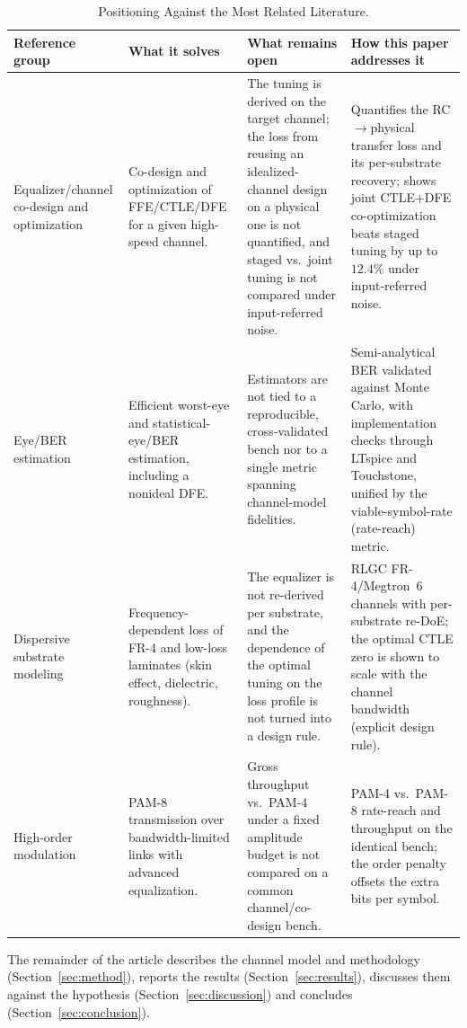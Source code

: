 \documentclass{ieeeaccess}
\begin{document}
\begin{table}[!t]
\caption{Positioning Against the Most Related Literature.}
\label{tab:gap}\centering
\footnotesize
\begin{tabular}{p{} p{} p{} p{}}
\hline
\textbf{Reference group} & \textbf{What it solves} & \textbf{What remains open} & \textbf{How this paper addresses it} \\
\hline
Equalizer/channel co-design and optimization \cite{11169790,11346689,11309336}
& Co-design and optimization of FFE/CTLE/DFE for a given high-speed channel.
& The tuning is derived on the target channel; the loss from reusing an idealized-channel design on a physical one is not quantified, and staged vs.\ joint tuning is not compared under input-referred noise.
& Quantifies the RC$\rightarrow$physical transfer loss and its per-substrate recovery; shows joint CTLE+DFE co-optimization beats staged tuning by up to $12.4\%$ under input-referred noise. \\
\hline
Eye/BER estimation \cite{10705630,10415105,10584882}
& Efficient worst-eye and statistical-eye/BER estimation, including a nonideal DFE.
& Estimators are not tied to a reproducible, cross-validated bench nor to a single metric spanning channel-model fidelities.
& Semi-analytical BER validated against Monte Carlo, with implementation checks through LTspice and Touchstone, unified by the viable-symbol-rate (rate-reach) metric. \\
\hline
Dispersive substrate modeling \cite{9785524,10385078,9888577}
& Frequency-dependent loss of FR-4 and low-loss laminates (skin effect, dielectric, roughness).
& The equalizer is not re-derived per substrate, and the dependence of the optimal tuning on the loss profile is not turned into a design rule.
& RLGC FR-4/Megtron~6 channels with per-substrate re-DoE; the optimal CTLE zero is shown to scale with the channel bandwidth (explicit design rule). \\
\hline
High-order modulation \cite{8963973}
& PAM-8 transmission over bandwidth-limited links with advanced equalization.
& Gross throughput vs.\ PAM-4 under a fixed amplitude budget is not compared on a common channel/co-design bench.
& PAM-4 vs.\ PAM-8 rate-reach and throughput on the identical bench; the order penalty offsets the extra bits per symbol. \\
\hline
\end{tabular}
\end{table}

The remainder of the article describes the channel model and methodology
(Section~\ref{sec:method}), reports the results
(Section~\ref{sec:results}), discusses them against the hypothesis
(Section~\ref{sec:discussion}) and concludes
(Section~\ref{sec:conclusion}).
\end{document}
